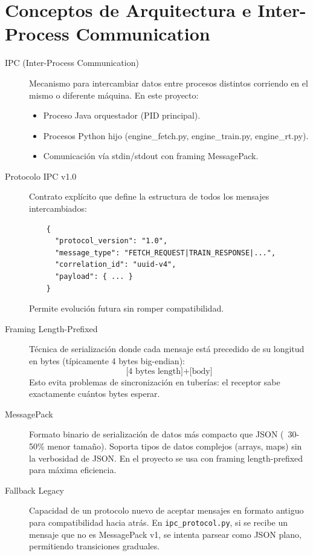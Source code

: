 
\section*{Conceptos de Arquitectura e Inter-Process Communication}

\begin{description}
    \item[IPC (Inter-Process Communication)] Mecanismo para intercambiar datos entre procesos distintos corriendo en el mismo o diferente máquina. En este proyecto:
    \begin{itemize}
        \item Proceso Java orquestador (PID principal).
        \item Procesos Python hijo (engine\_fetch.py, engine\_train.py, engine\_rt.py).
        \item Comunicación vía stdin/stdout con framing MessagePack.
    \end{itemize}

    \item[Protocolo IPC v1.0] Contrato explícito que define la estructura de todos los mensajes intercambiados:
    \begin{verbatim}
    {
      "protocol_version": "1.0",
      "message_type": "FETCH_REQUEST|TRAIN_RESPONSE|...",
      "correlation_id": "uuid-v4",
      "payload": { ... }
    }
    \end{verbatim}
    Permite evolución futura sin romper compatibilidad.

    \item[Framing Length-Prefixed] Técnica de serialización donde cada mensaje está precedido de su longitud en bytes (típicamente 4 bytes big-endian):
    $$\text{[4 bytes length]} + \text{[body]}$$
    Esto evita problemas de sincronización en tuberías: el receptor sabe exactamente cuántos bytes esperar.

    \item[MessagePack] Formato binario de serialización de datos más compacto que JSON (~30-50\% menor tamaño). Soporta tipos de datos complejos (arrays, maps) sin la verbosidad de JSON. En el proyecto se usa con framing length-prefixed para máxima eficiencia.

    \item[Fallback Legacy] Capacidad de un protocolo nuevo de aceptar mensajes en formato antiguo para compatibilidad hacia atrás. En \texttt{ipc\_protocol.py}, si se recibe un mensaje que no es MessagePack v1, se intenta parsear como JSON plano, permitiendo transiciones graduales.


\end{description}
